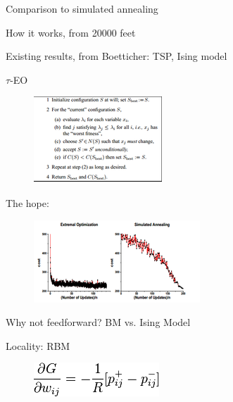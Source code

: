 \documentclass[12pt]{article}
\begin{document}
  Comparison to simulated annealing
  
  How it works, from 20000 feet

  Existing results, from Boetticher: TSP, Ising model

  $\tau$-EO
  
  \begin{figure}
    \includegraphics{eo_alg}
  \end{figure}
  
  The hope:
  \begin{figure}
    \includegraphics{boettcher}
  \end{figure}
  
  Why not feedforward? BM vs. Ising Model

  Locality: RBM

  \begin{figure}
    \includegraphics{rbm_eq}
  \end{figure}
  
\end{document}
